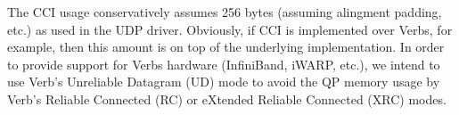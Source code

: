 
The CCI usage conservatively assumes 256 bytes (assuming alingment padding,
etc.) as used in the UDP driver. Obviously, if CCI is implemented over Verbs,
for example, then this amount is on top of the underlying implementation. In
order to provide support for Verbs hardware (InfiniBand, iWARP, etc.), we intend
to use Verb's Unreliable Datagram (UD) mode to avoid the QP memory usage by
Verb's Reliable Connected (RC) or eXtended Reliable Connected (XRC) modes.

